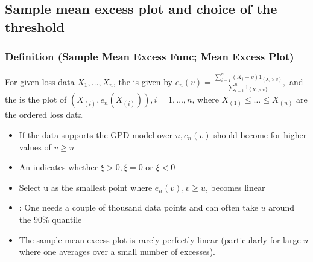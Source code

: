 \subsection*{Sample mean excess plot and choice of the threshold}
\subsubsection*{Definition (Sample Mean Excess Func; Mean Excess Plot)}
For given loss data $X_{1}, \ldots, X_{n}$, the  is given by
$
e_{n}(v)=\frac{\sum_{i=1}^{n}\left(X_{i}-v\right) 1_{\left\{X_{i}>v\right\}}}{\sum_{i=1}^{n} 1_{\left\{X_{i}>v\right\}}},
$
and the  is the plot of $\left(X_{(i)}, e_{n}\left(X_{(i)}\right)\right), i=1, \ldots, n$, where $X_{(1)} \leq \ldots \leq X_{(n)}$ are the ordered loss data

\begin{itemize}[leftmargin=*]
    \item If the data supports the GPD model over $u, e_{n}(v)$ should become  for higher values of $v \geq u$
    \item An  indicates whether $\xi>0, \xi=0$ or $\xi<0$
    \item Select $\mathrm{u}$ as the smallest point where $e_{n}(v), v \geq u$, becomes linear
    \item {}: One needs a couple of thousand data points and can often take $u$ around the $90 \%$ quantile
    \item The sample mean excess plot is rarely perfectly linear (particularly for large $u$ where one averages over a small number of excesses).
\end{itemize}



